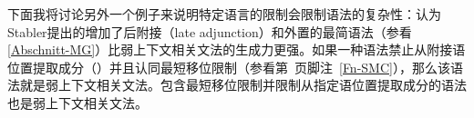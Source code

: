     下面我将讨论另外一个例子来说明特定语言的限制会限制语法的复杂性：\citet[\S~3.2]{GM2007a}认为Stabler提出的增加了后附接（late adjunction）和外置的最简语法\indexmgc（参看\ref{Abschnitt-MG}）比弱上下文相关文法的生成力更强。如果一种语法禁止从附接语位置提取成分（\citealp[]{FG2002a}）并且认同最短移位限制（参看第~\pageref{Fn-SMC}页脚注~\ref{Fn-SMC}），那么该语法就是弱上下文相关文法\citep[]{GM2007a}。包含最短移位限制并限制从指定语位置提取成分的语法也是弱上下文相关文法。

